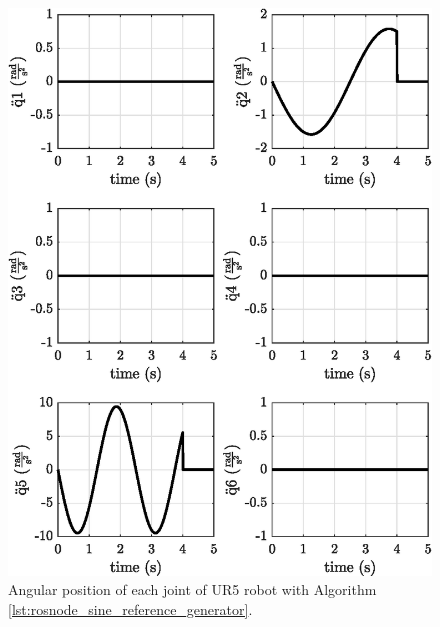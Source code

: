 \begin{figure}
    \centering
    \includegraphics{images/exp1.1/joint_acceleration.eps}
    \caption{Angular position of each joint of UR5 robot with Algorithm \ref{lst:rosnode_sine_reference_generator}.}
    \label{fig:act1.1_joint_acceleration}
\end{figure}